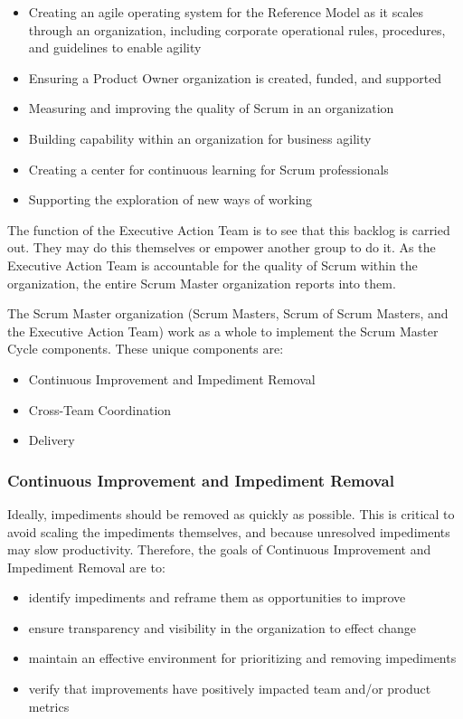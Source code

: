 \documentclass[12pt,a4paper,parskip=full]{scrartcl}
\begin{document}
\begin{itemize}
\itemsep1pt\parskip0pt
\item
  Creating an agile operating system for the Reference Model as it scales through an organization, including corporate operational rules, procedures, and guidelines to enable agility
\item
 Ensuring a Product Owner organization is created, funded, and supported
\item
  Measuring and improving the quality of Scrum in an organization
\item
  Building capability within an organization for business agility
\item
  Creating a center for continuous learning for Scrum professionals
\item
  Supporting the exploration of new ways of working
\end{itemize}

The function of the Executive Action Team is to see that this backlog is carried out. They may do this themselves or empower another group to do it. As the Executive Action Team is accountable for the quality of Scrum within the organization, the entire Scrum Master organization reports into them.

The Scrum Master organization (Scrum Masters, Scrum of Scrum Masters, and the Executive Action Team) work as a whole to implement the Scrum Master Cycle components. These unique components are:


\begin{itemize}
\itemsep1pt\parskip0pt
\item
  Continuous Improvement and Impediment Removal
\item
  Cross-Team Coordination
\item
  Delivery
\end{itemize}

\subsubsection{Continuous Improvement and Impediment
Removal}\label{Continuous-improvement-and-impediment-removal}

Ideally, impediments should be removed as quickly as possible. This is critical to avoid scaling the impediments themselves, and because unresolved impediments may slow productivity. Therefore, the goals of Continuous Improvement and Impediment Removal are to:


\begin{itemize}
\itemsep1pt\parskip0pt
\item
  identify impediments and reframe them as opportunities to improve
\item
  ensure transparency and visibility in the organization to effect
  change
\item
  maintain an effective environment for prioritizing and removing
  impediments
\item
  verify that improvements have positively impacted team and/or product
  metrics
\end{itemize}
\end{document}
